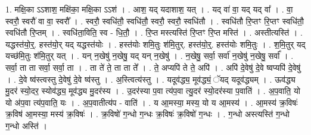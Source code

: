\documentclass[17pt]{extarticle}
\begin{document}
1. मक्षि॒का ऽऽशाश॒ मक्षि॑का॒ मक्षि॒का ऽऽश॑ । . आश॒ यद् यदाशाश॒ यत् । . यद् वा॑ वा॒ यद् यद् वा᳚ । . वा॒ स्वरौ॒ स्वरौ॑ वा वा॒ स्वरौ᳚ । . स्वरौ॒ स्वधि॑तौ॒ स्वधि॑तौ॒ स्वरौ॒ स्वरौ॒ स्वधि॑तौ । . स्वधि॑तौ रि॒प्तꣳ रि॒प्तꣳ स्वधि॑तौ॒ स्वधि॑तौ रि॒प्तम् । . स्वधि॑ता॒विति॒ स्व - धि॒तौ॒ । . रि॒प्त मस्त्यस्ति॑ रि॒प्तꣳ रि॒प्त मस्ति॑ । . अस्तीत्यस्ति॑ । . यद्धस्त॑यो॒र्॒. हस्त॑यो॒र् यद् यद्धस्त॑योः । . हस्त॑योः शमि॒तुः श॑मि॒तुर्. हस्त॑यो॒र्॒. हस्त॑योः शमि॒तुः । . श॒मि॒तुर् यद् यच्छ॑मि॒तुः श॑मि॒तुर् यत् । . यन् न॒खेषु॑ न॒खेषु॒ यद् यन् न॒खेषु॑ । . न॒खेषु॒ सर्वा॒ सर्वा॑ न॒खेषु॑ न॒खेषु॒ सर्वा᳚ । . सर्वा॒ ता ता सर्वा॒ सर्वा॒ ता । . ता ते॑ ते॒ ता ता ते᳚ । . ते॒ अप्यपि॑ ते ते॒ अपि॑ । . अपि॑ दे॒वेषु॑ दे॒वे ष्वप्यपि॑ दे॒वेषु॑ । . दे॒वे ष्व॑स्त्वस्तु दे॒वेषु॑ दे॒वे ष्व॑स्तु । . अ॒स्त्वित्य॑स्तु । . यदूव॑द्ध्य॒ मूव॑द्ध्यं॒ ॅयद् यदूव॑द्ध्यम् । . ऊव॑द्ध्य मु॒दर॑ स्यो॒दर॒ स्योव॑द्ध्य॒ मूव॑द्ध्य मु॒दर॑स्य । . उ॒दर॑स्या प॒वा त्य॑प॒वा त्यु॒दर॑ स्यो॒दर॑स्या प॒वाति॑ । . अ॒प॒वाति॒ यो यो अ॑प॒वा त्य॑प॒वाति॒ यः । . अ॒प॒वातीत्य॑प - वाति॑ । . य आ॒मस्या॒ मस्य॒ यो य आ॒मस्य॑ । . आ॒मस्य॑ क्र॒विषः॑ क्र॒विष॑ आ॒मस्या॒ मस्य॑ क्र॒विषः॑ । . क्र॒विषो॑ ग॒न्धो ग॒न्धः क्र॒विषः॑ क्र॒विषो॑ ग॒न्धः । . ग॒न्धो अस्त्यस्ति॑ ग॒न्धो ग॒न्धो अस्ति॑ । \newline
\end{document}
